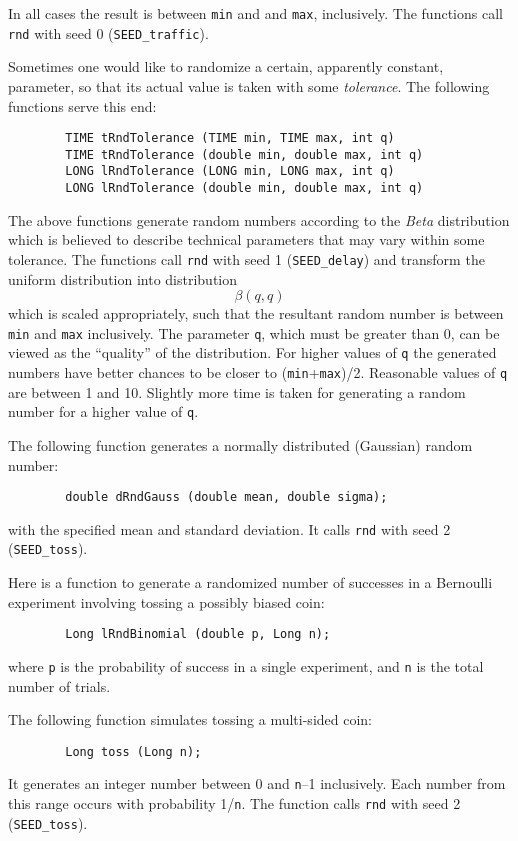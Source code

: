 In all cases the result is
between {\tt min} and and {\tt max}, inclusively.
The functions call {\tt rnd} with seed 0 ({\tt SEED\_traffic}).

Sometimes one would like to randomize a certain, apparently constant,
parameter, so that its actual value is taken with some {\em tolerance}.
The following functions serve this end:
\begin{verbatim}
        TIME tRndTolerance (TIME min, TIME max, int q)
        TIME tRndTolerance (double min, double max, int q)
        LONG lRndTolerance (LONG min, LONG max, int q)
        LONG lRndTolerance (double min, double max, int q)
\end{verbatim}

The above functions generate random numbers according to the {\em Beta\/}
distribution which is believed to describe technical parameters that may
vary within some tolerance.
The functions call {\tt rnd} with seed 1
({\tt SEED\_delay}) and transform the uniform distribution into distribution
\[
\beta (q, q)
\]
\noindent
which is scaled appropriately, such that the resultant random
number is between {\tt min} and {\tt max} inclusively.
The parameter {\tt q}, which must be greater than 0,
can be viewed as the ``quality'' of the distribution.
For higher values of
{\tt q} the generated numbers have better chances to be closer to
({\tt min}+{\tt max})/2.
Reasonable values of {\tt q} are between 1 and 10.
Slightly more time is taken for generating a random number for a higher
value of {\tt q}.

The following function generates a normally distributed (Gaussian) random
number:
\begin{verbatim}
        double dRndGauss (double mean, double sigma);
\end{verbatim}
with the specified mean and standard deviation.
It calls {\tt rnd} with seed 2 ({\tt SEED\_toss}).

Here is a function to generate a randomized number of successes in a
Bernoulli experiment involving tossing a possibly biased coin:
\begin{verbatim}
        Long lRndBinomial (double p, Long n);
\end{verbatim}
\noindent
where {\tt p} is the probability of success in a single experiment, and {\tt n}
is the total number of trials.

The following function simulates tossing a multi-sided coin:
\begin{verbatim}
        Long toss (Long n);
\end{verbatim}
It generates an integer number between 0 and {\tt n}--1
inclusively. Each number from this range occurs
with probability 1/{\tt n}. The function calls {\tt rnd} with seed 2
({\tt SEED\_toss}).


